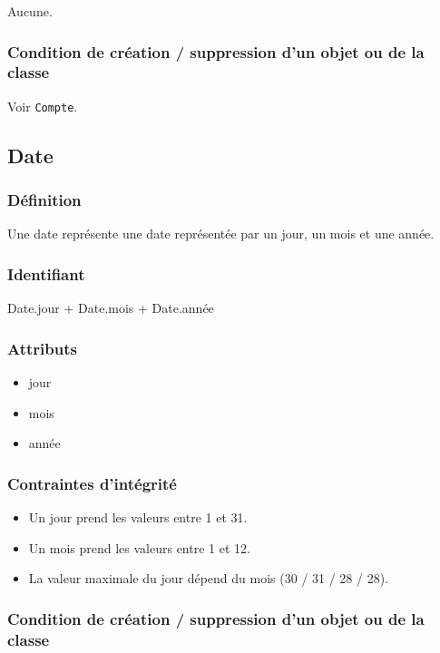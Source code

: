 \documentclass[a4paper, 11pt]{report}
\begin{document}
Aucune.

\subsubsection{Condition de création / suppression d'un objet ou de la classe}

Voir \texttt{Compte}.

\subsection{Date}

\subsubsection{Définition}

Une date représente une date représentée par un jour, un mois et une année.

\subsubsection{Identifiant}

Date.jour + Date.mois + Date.année

\subsubsection{Attributs}

\begin{itemize}

    \item{jour}
    \item{mois}
    \item{année}

\end{itemize}

\subsubsection{Contraintes d'intégrité}

\begin{itemize}
    \item Un jour prend les valeurs entre 1 et 31.
    \item Un mois prend les valeurs entre 1 et 12.
    \item La valeur maximale du jour dépend du mois (30 / 31 / 28 / 28).
\end{itemize}

\subsubsection{Condition de création / suppression d'un objet ou de la classe}
\end{document}
